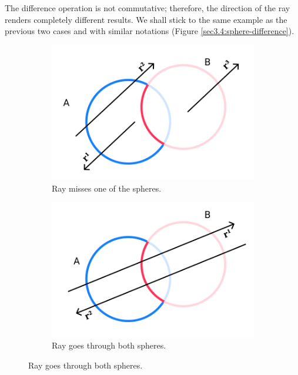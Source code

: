 \documentclass[a4paper,11pt,oneside]{article}
\begin{document}
The difference operation is not commutative; therefore, the direction of the ray renders completely different results. We shall stick to the same example as the previous two cases and with similar notations (Figure \ref{sec3.4:sphere-difference}).

\begin{figure}[ht]
	\centering
	\begin{subfigure}[b]{0.3\textwidth}
		\centering
		\includegraphics[width=\textwidth]{section4/4.1/difference-case-1.png}
		\caption{Ray misses one of the spheres.}
		\label{sec3.4:difference-case-1}
	\end{subfigure}
	\hfill
	\begin{subfigure}[b]{0.3\textwidth}
		\centering
		\includegraphics[width=\textwidth]{section4/4.1/difference-case-2.png}
		\caption{Ray goes through both spheres.}
		\label{sec3.4:difference-case-2}
	\end{subfigure}	

\end{figure}
\end{document}

